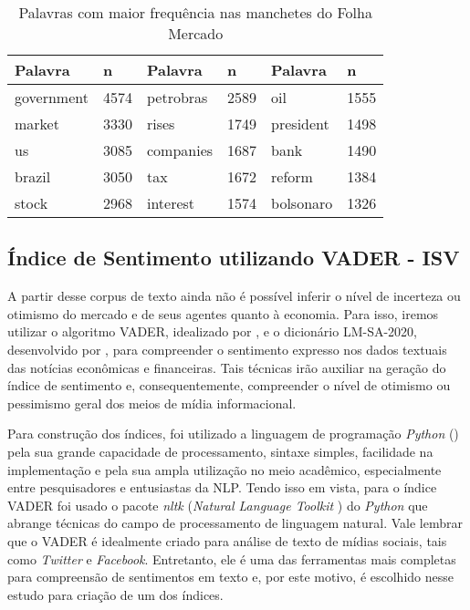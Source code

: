 \begin{table}[!h]
\centering
\caption{Palavras com maior frequência nas manchetes do Folha Mercado}
\begin{tabular}{ll|ll|ll}
\hline
Palavra     & n     & Palavra   & n    & Palavra   & n    \\ \hline
government  & 4574  & petrobras & 2589 & oil       & 1555 \\
market      & 3330  & rises     & 1749 & president & 1498 \\
us          & 3085  & companies & 1687 & bank      & 1490 \\
brazil      & 3050  & tax       & 1672 & reform    & 1384 \\
stock       & 2968  & interest  & 1574 & bolsonaro & 1326 \\ \hline
\end{tabular} \label{tab:contgeral}
\end{table}

\subsection{Índice de Sentimento utilizando VADER - ISV}

A partir desse corpus de texto ainda não é possível inferir o nível de incerteza ou otimismo do mercado e de seus agentes quanto à economia. Para isso, iremos utilizar o algoritmo VADER, idealizado por , e o dicionário LM-SA-2020, desenvolvido por , para compreender o sentimento expresso nos dados textuais das notícias econômicas e financeiras. Tais técnicas irão auxiliar na geração do índice de sentimento e, consequentemente, compreender o nível de otimismo ou pessimismo geral dos meios de mídia informacional.

Para construção dos índices, foi utilizado a linguagem de programação \textit{Python} () pela sua grande capacidade de processamento, sintaxe simples, facilidade na implementação e pela sua ampla utilização no meio acadêmico, especialmente entre pesquisadores e entusiastas da NLP. Tendo isso em vista, para o índice VADER foi usado o pacote \textit{nltk} (\textit{Natural Language Toolkit} ) do \textit{Python} que abrange técnicas do campo de processamento de linguagem natural. Vale lembrar que o VADER é idealmente criado para análise de texto de mídias sociais, tais como \textit{Twitter} e \textit{Facebook}. Entretanto, ele é uma das ferramentas mais completas para compreensão de sentimentos em texto e, por este motivo, é escolhido nesse estudo para criação de um dos índices.


